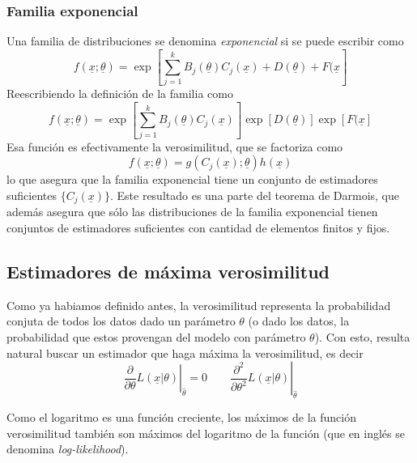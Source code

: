 \documentclass{article}
\numberwithin{equation}{section} %
\begin{document}
\subsubsection{Familia exponencial}
Una familia de distribuciones se denomina \emph{exponencial} si se puede escribir como
\begin{equation}
f(\underline{x};\underline{\theta}) = \exp\left[ \sum_{j=1}^{k} B_j(\underline{\theta}) C_j(\underline{x}) + D(\underline{\theta}) + F(\underline{x}\right]
\end{equation}
Reescribiendo la definición de la familia como
\[f(\underline{x};\underline{\theta}) = \exp\left[ \sum_{j=1}^{k} B_j(\underline{\theta}) C_j(\underline{x})\right] \exp[D(\underline{\theta})] \exp[F(\underline{x}] \]
Esa función es efectivamente la verosimilitud, que se factoriza como
\begin{equation}
f(\underline{x};\underline{\theta}) = g(C_j(\underline{x});\underline{\theta}) h(\underline{x})
\end{equation}
lo que asegura que la familia exponencial tiene un conjunto de estimadores suficientes $\{C_j(\underline{x})\}$.
Este resultado es una parte del teorema de Darmois, que además asegura que sólo las distribuciones de la familia exponencial tienen conjuntos de estimadores suficientes con cantidad de elementos finitos y fijos.

\subsection{Estimadores de máxima verosimilitud}
Como ya habiamos definido antes, la verosimilitud representa la probabilidad conjuta de todos los datos dado un parámetro $\theta$ (o dado los datos, la probabilidad que estos provengan del modelo con parámetro $\theta$). Con esto, resulta natural buscar un estimador que haga máxima la verosimilitud, es decir
\begin{equation}
\left.\frac{\partial}{\partial \theta} L(\underline{x}|\theta) \right|_{\hat{\theta}} = 0 \qquad \left.\frac{\partial^2}{\partial \theta^2} L(\underline{x}|\theta)\right|_{\hat{\theta}}
\end{equation}

Como el logaritmo es una función creciente, los máximos de la función verosimilitud también son máximos del logaritmo de la función (que en inglés se denomina \emph{log-likelihood}). 
\end{document}
